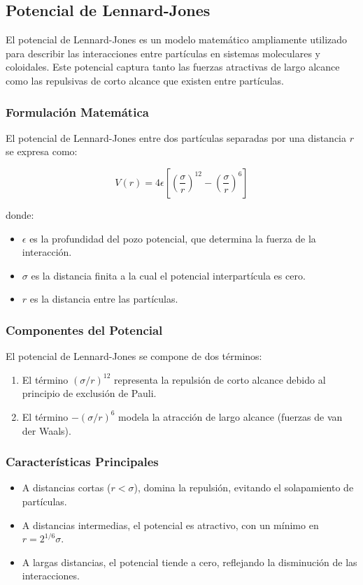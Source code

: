 \documentclass[twocolumn]{article}
\begin{document}
\subsection*{Potencial de Lennard-Jones}
El potencial de Lennard-Jones es un modelo matemático ampliamente utilizado para describir las interacciones entre partículas en sistemas moleculares y coloidales. Este potencial captura tanto las fuerzas atractivas de largo alcance como las repulsivas de corto alcance que existen entre partículas.

\subsubsection*{Formulación Matemática}
El potencial de Lennard-Jones entre dos partículas separadas por una distancia $r$ se expresa como:

\begin{equation}
    V(r) = 4\epsilon \left[ \left(\frac{\sigma}{r}\right)^{12} - \left(\frac{\sigma}{r}\right)^{6} \right]
\end{equation}

donde:
\begin{itemize}
    \item $\epsilon$ es la profundidad del pozo potencial, que determina la fuerza de la interacción.
    \item $\sigma$ es la distancia finita a la cual el potencial interpartícula es cero.
    \item $r$ es la distancia entre las partículas.
\end{itemize}

\subsubsection*{Componentes del Potencial}
El potencial de Lennard-Jones se compone de dos términos:

\begin{enumerate}
    \item El término $(\sigma/r)^{12}$ representa la repulsión de corto alcance debido al principio de exclusión de Pauli.
    \item El término $-(\sigma/r)^{6}$ modela la atracción de largo alcance (fuerzas de van der Waals).
\end{enumerate}

\subsubsection*{Características Principales}
\begin{itemize}
    \item A distancias cortas ($r < \sigma$), domina la repulsión, evitando el solapamiento de partículas.
    \item A distancias intermedias, el potencial es atractivo, con un mínimo en $r = 2^{1/6}\sigma$.
    \item A largas distancias, el potencial tiende a cero, reflejando la disminución de las interacciones.
\end{itemize}
\end{document}
